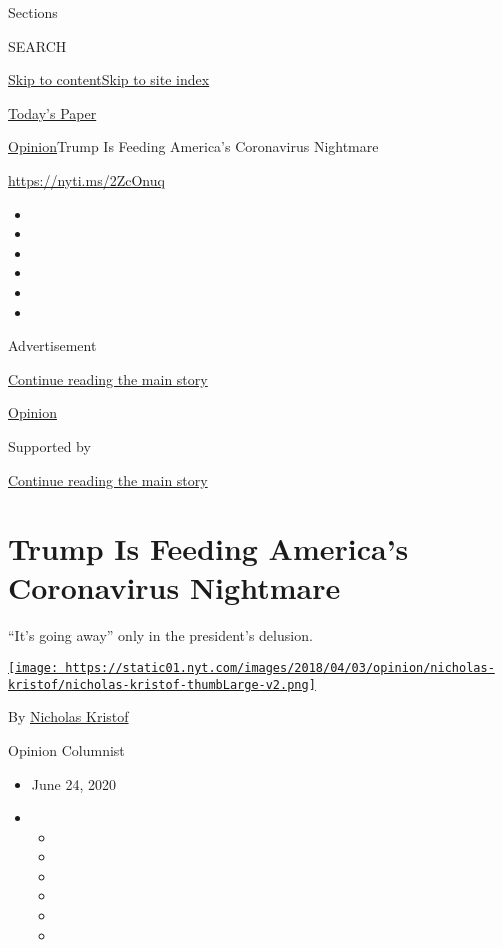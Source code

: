 Sections

SEARCH

\protect\hyperlink{site-content}{Skip to
content}\protect\hyperlink{site-index}{Skip to site index}

\href{https://myaccount.nytimes.com/auth/login?response_type=cookie\&client_id=vi}{}

\href{https://www.nytimes.com/section/todayspaper}{Today's Paper}

\href{/section/opinion}{Opinion}\textbar{}Trump Is Feeding America's
Coronavirus Nightmare

\href{https://nyti.ms/2ZcOnuq}{https://nyti.ms/2ZcOnuq}

\begin{itemize}
\item
\item
\item
\item
\item
\item
\end{itemize}

Advertisement

\protect\hyperlink{after-top}{Continue reading the main story}

\href{/section/opinion}{Opinion}

Supported by

\protect\hyperlink{after-sponsor}{Continue reading the main story}

\hypertarget{trump-is-feeding-americas-coronavirus-nightmare}{%
\section{Trump Is Feeding America's Coronavirus
Nightmare}\label{trump-is-feeding-americas-coronavirus-nightmare}}

``It's going away'' only in the president's delusion.

\href{https://www.nytimes.com/column/nicholas-kristof}{\texttt{[image: https://static01.nyt.com/images/2018/04/03/opinion/nicholas-kristof/nicholas-kristof-thumbLarge-v2.png]}}

By \href{https://www.nytimes.com/column/nicholas-kristof}{Nicholas
Kristof}

Opinion Columnist

\begin{itemize}
\item
  June 24, 2020
\item
  \begin{itemize}
  \item
  \item
  \item
  \item
  \item
  \item
  \end{itemize}
\end{itemize}

